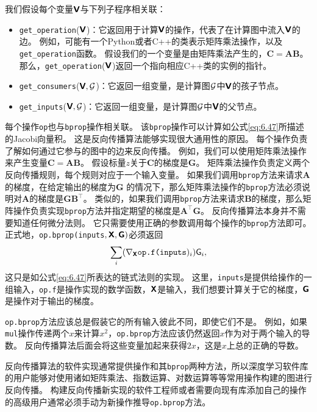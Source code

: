 我们假设每个变量$\textsf{\textbf{V}}$与下列子程序相关联：
\begin{itemize}
    \item \verb|get_operation|($\textsf{\textbf{V}}$)：它返回用于计算$\textsf{\textbf{V}}$的操作，代表了在计算图中流入$\textsf{\textbf{V}}$的边。
    例如，可能有一个Python或者C++的类表示矩阵乘法操作，以及\verb|get_operation|函数。
    假设我们的一个变量是由矩阵乘法产生的，$\bm{C}=\bm{A}\bm{B}$。
    那么，\verb|get_operation|($\textsf{\textbf{V}}$)返回一个指向相应C++类的实例的指针。

    \item \verb|get_consumers|($\textsf{\textbf{V}}, \mathcal{G}$)：它返回一组变量，是计算图$\mathcal{G}$中$\textsf{\textbf{V}}$的孩子节点。

    \item \verb|get_inputs|($\textsf{\textbf{V}}, \mathcal{G}$)：它返回一组变量，是计算图$\mathcal{G}$中$\textsf{\textbf{V}}$的父节点。
\end{itemize}

  
每个操作\verb|op|也与\verb|bprop|操作相关联。
该\verb|bprop|操作可以计算如公式\ref{eq:6.47}所描述的Jacobi向量积。
这是反向传播算法能够实现很大通用性的原因。
每个操作负责了解如何通过它参与的图中的边来反向传播。
例如，我们可以使用矩阵乘法操作来产生变量$\bm{C}=\bm{A}\bm{B}$。
假设标量$z$关于$\bm{C}$的梯度是$\bm{G}$。
矩阵乘法操作负责定义两个反向传播规则，每个规则对应于一个输入变量。
如果我们调用\verb|bprop|方法来请求$\bm{A}$的梯度，在给定输出的梯度为$\bm{G}$ 的情况下，那么矩阵乘法操作的\verb|bprop|方法必须说明对$\bm{A}$的梯度是$\bm{G}\bm{B}^\top$。
类似的，如果我们调用\verb|bprop|方法来请求$\bm{B}$的梯度，那么矩阵操作负责实现\verb|bprop|方法并指定期望的梯度是$\bm{A}^\top\bm{G}$。
反向传播算法本身并不需要知道任何微分法则。
它只需要使用正确的参数调用每个操作的\verb|bprop|方法即可。
正式地，\verb|op.bprop(inputs|$, \textsf{\textbf{X}}, \textsf{\textbf{G}})$必须返回
\begin{equation}
  \sum_i (\nabla_{\TSX} \verb|op.f(inputs|)_i) \textsf{G}_i,
\end{equation}
这只是如公式\ref{eq:6.47}所表达的链式法则的实现。
这里，\verb|inputs|是提供给操作的一组输入，\verb|op.f|是操作实现的数学函数，$\textsf{\textbf{X}}$是输入，我们想要计算关于它的梯度，$\textsf{\textbf{G}}$是操作对于输出的梯度。

\verb|op.bprop|方法应该总是假装它的所有输入彼此不同，即使它们不是。
例如，如果\verb|mul|操作传递两个$x$来计算$x^2$，\verb|op.bprop|方法应该仍然返回$x$作为对于两个输入的导数。
反向传播算法后面会将这些变量加起来获得$2x$，这是$x$上总的正确的导数。

反向传播算法的软件实现通常提供操作和其\verb|bprop|两种方法，所以深度学习软件库的用户能够对使用诸如矩阵乘法、指数运算、对数运算等等常用操作构建的图进行反向传播。
构建反向传播新实现的软件工程师或者需要向现有库添加自己的操作的高级用户通常必须手动为新操作推导\verb|op.bprop|方法。

